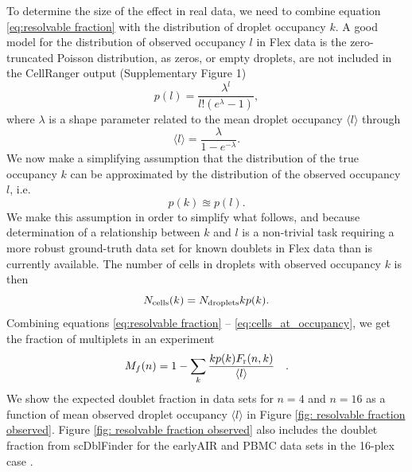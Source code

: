 \documentclass[unnumsec,webpdf,modern,large]{oup-authoring-template}
\begin{document}
	To determine the size of the effect in real data, we need to combine equation \eqref{eq:resolvable fraction} with the distribution of droplet occupancy $k$. 
	A good model for the distribution of observed occupancy $l$ in Flex data is the zero-truncated Poisson distribution, as zeros, or empty droplets, are not included in the CellRanger output (Supplementary Figure 1)
	\begin{equation}
		p(l) = \frac{\lambda^l}{l! (e^{\lambda} - 1)}  ,
		\label{eq: poisson_distribution} 
	\end{equation}
	where $\lambda$ is a shape parameter related to the mean droplet occupancy $\langle l \rangle$ through
	\begin{equation}
		\langle l \rangle = \frac{\lambda}{1 - e^{- \lambda}}  .
		\label{eq: poisson expectation value}
	\end{equation}
	We now make a simplifying assumption that the distribution of the true occupancy $k$ can be approximated by the distribution of the observed occupancy $l$, i.e.
	\begin{equation}
		p(k) \approxeq p(l)  .
		\label{eq:pdf approximation}
	\end{equation}
	We make this assumption in order to simplify what follows, and because determination of a relationship between $k$ and $l$ is a non-trivial task requiring a more robust ground-truth data set for known doublets in Flex data than is currently available. 
	The number of cells in droplets with observed occupancy $k$ is then 
	\begin{equation}
		N_{\rm cells}(k) = N_{\rm droplets} k p(k).
		\label{eq:cells_at_occupancy}
	\end{equation}
	Combining  equations \eqref{eq:resolvable fraction} -- \eqref{eq:cells_at_occupancy}, we get the fraction of multiplets in an experiment 
	\begin{equation}
		M_f(n) = 1 - \sum_k \frac{k p(k) F_{\rm r}(n, k)}{\langle l \rangle} \quad .
		\label{eq:dataset resolvable fraction}
	\end{equation}
	We show the expected doublet fraction in data sets for $n = 4$ and $n = 16$ as a function of mean observed droplet occupancy $\langle l \rangle$ in Figure \ref{fig: resolvable fraction observed}.
	Figure \ref{fig: resolvable fraction observed} also includes the doublet fraction from scDblFinder for the earlyAIR and PBMC data sets in the 16-plex case 
	\citep{Germain2021}.
\end{document}
